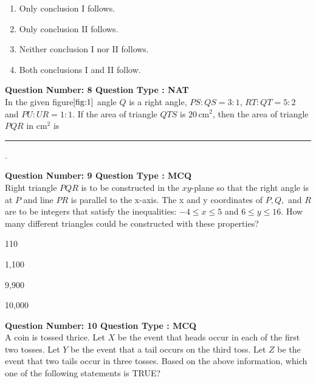 \begin{enumerate}
    \item Only conclusion I follows.
    \item Only conclusion II follows.
    \item Neither conclusion I nor II follows.
    \item Both conclusions I and II follow.
\end{enumerate}
\bigskip
\item \textbf{Question Number: 8 Question Type : NAT}\\
In the given figure$\ref{fig:1}$ angle $ Q $ is a right angle, $ PS:QS = 3:1 $, $ RT:QT = 5:2 $ and $ PU:UR = 1:1 $. If the area of triangle $ QTS $ is $ 20 \, \text{cm}^2 $, then the area of triangle $ PQR $ in $ \text{cm}^2 $ is \rule{1cm}{0.15mm}.
\begin{figure}[H]
    \centering
    \caption{}
    \label{fig:1}
\end{figure}
\bigskip
\item \textbf{Question Number: 9 Question Type : MCQ}\\
Right triangle $ PQR $ is to be constructed in the $ xy $-plane so that the right angle is at $ P $ and line $ PR $ is parallel to the x-axis. The x and y coordinates of $ P, Q, $ and $ R $ are to be integers that satisfy the inequalities: $ -4 \leq x \leq 5 $ and $ 6 \leq y \leq 16 $. How many different triangles could be constructed with these properties? \\

\begin{enumerate}
\begin{multicols}{4}
    \item 110
    \item 1,100
    \item 9,900
    \item 10,000
    \end{multicols}
\end{enumerate}
\bigskip
\item \textbf{Question Number: 10 Question Type : MCQ}\\
A coin is tossed thrice. Let $ X $ be the event that heads occur in each of the first two tosses. Let $ Y $ be the event that a tail occurs on the third toss. Let $ Z $ be the event that two tails occur in three tosses. Based on the above information, which one of the following statements is TRUE? \\

